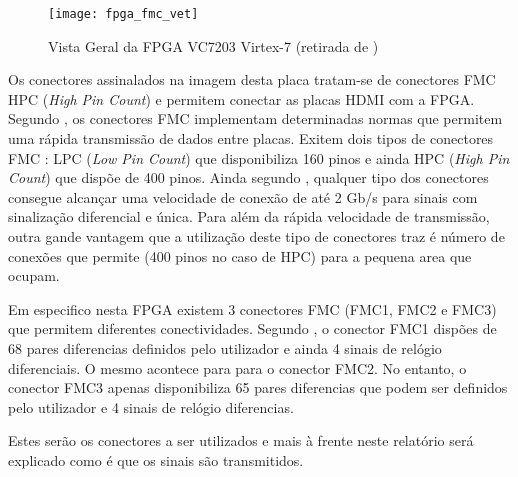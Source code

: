 \begin{figure}[h!]
	\begin{center}
		\leavevmode
		\texttt{[image: fpga\_fmc\_vet]}
		\caption[Vista Geral da FPGA VC7203 Virtex-7]{Vista Geral da FPGA VC7203 Virtex-7 (retirada de \cite{R008})}
		\label{fig:fpgaVistaGeral}
	\end{center}
\end{figure}

Os conectores assinalados na imagem desta placa tratam-se de conectores FMC HPC (\textit{High Pin Count}) e permitem conectar as placas HDMI com a FPGA. Segundo \cite{R030}, os conectores FMC implementam determinadas normas que permitem uma rápida transmissão de dados entre placas. Exitem dois tipos de conectores FMC : LPC (\textit{Low Pin Count}) que disponibiliza 160 pinos e ainda HPC (\textit{High Pin Count}) que dispõe de 400 pinos. Ainda segundo \cite{R030}, qualquer tipo dos conectores consegue alcançar uma velocidade de conexão de até 2 Gb/s para sinais com sinalização diferencial e única. Para além da rápida velocidade de transmissão, outra gande vantagem que a utilização deste tipo de conectores traz é número de conexões que permite (400 pinos no caso de HPC) para a pequena area que ocupam. 

Em especifico nesta FPGA existem 3 conectores FMC (FMC1, FMC2 e FMC3) que permitem diferentes conectividades. Segundo \cite{R008}, o conector FMC1 dispões de 68 pares diferencias definidos pelo utilizador e ainda 4 sinais de relógio diferenciais. O mesmo acontece para para o conector FMC2. No entanto, o conector FMC3 apenas disponibiliza 65 pares diferencias que podem ser definidos pelo utilizador e 4 sinais de relógio diferencias.

Estes serão os conectores a ser utilizados e mais à frente neste relatório será explicado como é que os sinais são transmitidos. 



